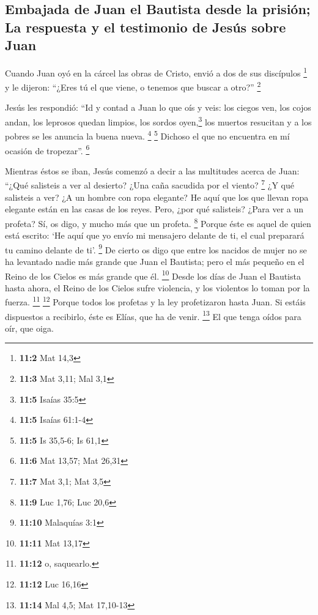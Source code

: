 \hypertarget{embajada-de-juan-el-bautista-desde-la-prisiuxf3n-la-respuesta-y-el-testimonio-de-jesuxfas-sobre-juan}{%
\subsection{Embajada de Juan el Bautista desde la prisión; La respuesta
y el testimonio de Jesús sobre
Juan}\label{embajada-de-juan-el-bautista-desde-la-prisiuxf3n-la-respuesta-y-el-testimonio-de-jesuxfas-sobre-juan}}

 Cuando Juan oyó en la cárcel las obras de Cristo, envió a
dos de sus discípulos \footnote{\textbf{11:2} Mat 14,3}  y
le dijeron: ``¿Eres tú el que viene, o tenemos que buscar a otro?''
\footnote{\textbf{11:3} Mat 3,11; Mal 3,1}

 Jesús les respondió: ``Id y contad a Juan lo que oís y
veis:  los ciegos ven, los cojos andan, los leprosos
quedan limpios, los sordos oyen,\footnote{\textbf{11:5} Isaías 35:5} los
muertos resucitan y a los pobres se les anuncia la buena nueva.
\footnote{\textbf{11:5} Isaías 61:1-4} \footnote{\textbf{11:5} Is
  35,5-6; Is 61,1}  Dichoso el que no encuentra en mí
ocasión de tropezar''. \footnote{\textbf{11:6} Mat 13,57; Mat 26,31}

 Mientras éstos se iban, Jesús comenzó a decir a las
multitudes acerca de Juan: ``¿Qué salisteis a ver al desierto? ¿Una caña
sacudida por el viento? \footnote{\textbf{11:7} Mat 3,1; Mat 3,5}
 ¿Y qué salisteis a ver? ¿A un hombre con ropa elegante?
He aquí que los que llevan ropa elegante están en las casas de los
reyes.  Pero, ¿por qué salisteis? ¿Para ver a un profeta?
Sí, os digo, y mucho más que un profeta. \footnote{\textbf{11:9} Luc
  1,76; Luc 20,6}  Porque éste es aquel de quien está
escrito: `He aquí que yo envío mi mensajero delante de ti, el cual
preparará tu camino delante de ti'. \footnote{\textbf{11:10} Malaquías
  3:1}  De cierto os digo que entre los nacidos de mujer
no se ha levantado nadie más grande que Juan el Bautista; pero el más
pequeño en el Reino de los Cielos es más grande que él. \footnote{\textbf{11:11}
  Mat 13,17}  Desde los días de Juan el Bautista hasta
ahora, el Reino de los Cielos sufre violencia, y los violentos lo toman
por la fuerza. \footnote{\textbf{11:12} o, saquearlo.} \footnote{\textbf{11:12}
  Luc 16,16}  Porque todos los profetas y la ley
profetizaron hasta Juan.  Si estáis dispuestos a
recibirlo, éste es Elías, que ha de venir. \footnote{\textbf{11:14} Mal
  4,5; Mat 17,10-13}  El que tenga oídos para oír, que
oiga.

